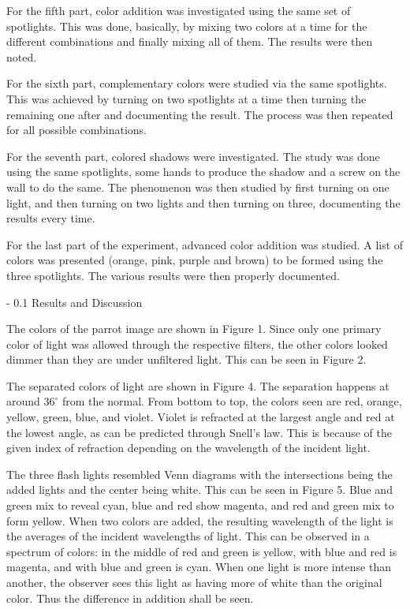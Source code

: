 \documentclass[twoside]{article}
\makeatletter
\renewcommand\section{\@startsection
   {section}{1}{0pt}%
   {-\baselineskip}%
   {0.1\baselineskip}%
   {\normalfont\large\bfseries}}%
\makeatother
\begin{document}
    For the fifth part, color addition was investigated using the same set of spotlights.  This was done, basically, by mixing two colors at a time for the different combinations and finally mixing all of them.  The results were then noted.
	
    For the sixth part, complementary colors were studied via the same spotlights.  This was achieved by turning on two spotlights at a time then turning the remaining one after and documenting the result.  The process was then repeated for all possible combinations.
	
    For the seventh part, colored shadows were investigated.  The study was done using the same spotlights, some hands to produce the shadow and a screw on the wall to do the same.  The phenomenon was then studied by first turning on one light, and then turning on two lights and then turning on three, documenting the results every time.  
	
    For the last part of the experiment, advanced color addition was studied.  A list of colors was presented (orange, pink, purple and brown) to be formed using the three spotlights.  The various results were then properly documented.      




\section{Results and Discussion}
\label{sec:RnD}

The colors of the parrot image are shown in Figure 1. Since only one primary color of light was allowed through the respective filters, the other colors looked dimmer than they are under unfiltered light. This can be seen in Figure 2.

The separated colors of light are shown in Figure 4. The separation happens at around $36^{\circ}$ from the normal. From bottom to top, the colors seen are red, orange, yellow, green, blue, and violet. Violet is refracted at the largest angle and red at the lowest angle, as can be predicted through Snell's law. This is because of the given index of refraction depending on the wavelength of the incident light.

The three flash lights resembled Venn diagrams with the intersections being the added lights and the center being white. This can be seen in Figure 5. Blue and green mix to reveal cyan, blue and red show magenta, and red and green mix to form yellow. When two colors are added, the resulting wavelength of the light is the averages of the incident wavelengths of light. This can be observed in a spectrum of colors: in the middle of red and green is yellow, with blue and red is magenta, and with blue and green is cyan. When one light is more intense than another, the observer sees this light as having more of white than the original color. Thus the difference in addition shall be seen.
\end{document}
